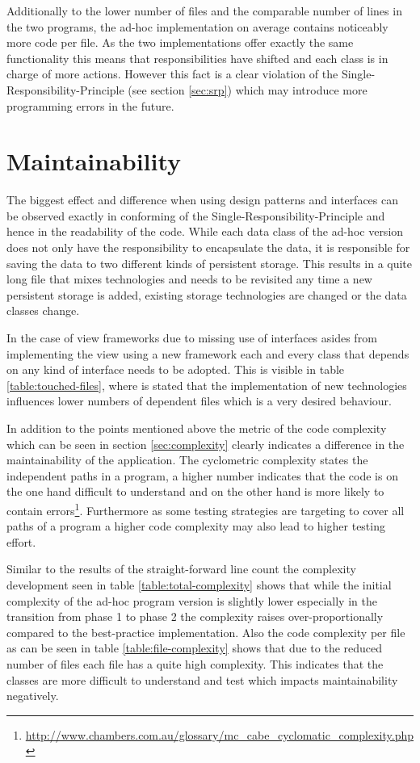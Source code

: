 Additionally to the lower number of files and the comparable number of lines in the two programs, the ad-hoc implementation on average contains noticeably more code per file. As the two implementations offer exactly the same functionality this means that responsibilities have shifted and each class is in charge of more actions. However this fact is a clear violation of the Single-Responsibility-Principle (see section \ref{sec:srp}) which may introduce more programming errors in the future. 

\section{Maintainability}
The biggest effect and difference when using design patterns and interfaces can be observed exactly in conforming of the Single-Responsibility-Principle and hence in the readability of the code. While each data class of the ad-hoc version does not only have the responsibility to encapsulate the data, it is responsible for saving the data to two different kinds of persistent storage. This results in a quite long file that mixes technologies and needs to be revisited any time a new persistent storage is added, existing storage technologies are changed or the data classes change. 

In the case of view frameworks due to missing use of interfaces asides from implementing the view using a new framework each and every class that depends on any kind of interface needs to be adopted. This is visible in table \ref{table:touched-files}, where is stated that the implementation of new technologies influences lower numbers of dependent files which is a very desired behaviour. 

In addition to the points mentioned above the metric of the code complexity which can be seen in section \ref{sec:complexity} clearly indicates a difference in the maintainability of the application. The cyclometric complexity states the independent paths in a program, a higher number indicates that the code is on the one hand difficult to understand and on the other hand is more likely to contain errors\footnote{\href{http://www.chambers.com.au/glossary/mc\_cabe\_cyclomatic\_complexity.php}{http://www.chambers.com.au/glossary/mc\_cabe\_cyclomatic\_complexity.php}}. Furthermore as some testing strategies are targeting to cover all paths of a program a higher code complexity may also lead to higher testing effort.

Similar to the results of the straight-forward line count the complexity development seen in table \ref{table:total-complexity} shows that while the initial complexity of the ad-hoc program version is slightly lower especially in the transition from phase 1 to phase 2 the complexity raises over-proportionally compared to the best-practice implementation. 
Also the code complexity per file as can be seen in table \ref{table:file-complexity} shows that due to the reduced number of files each file has a quite high complexity. This indicates that the classes are more difficult to understand and test which impacts maintainability negatively. 
